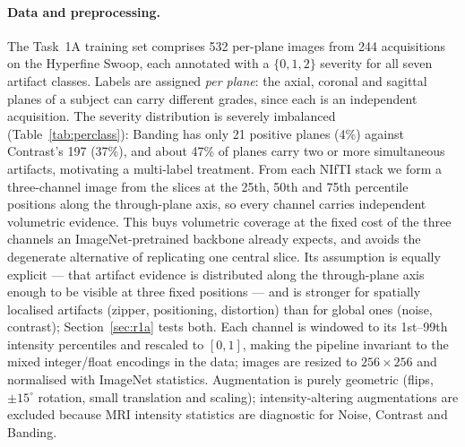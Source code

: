 \documentclass[runningheads]{llncs}
\newcommand{\addtwo}[1]{\textcolor{revtwo}{#1}}
\begin{document}
\paragraph{Data and preprocessing.}
The Task~1A training set comprises 532 per-plane images from 244 acquisitions on
the Hyperfine Swoop, each annotated with a $\{0,1,2\}$ severity for all seven
artifact classes. Labels are assigned \emph{per plane}: the axial, coronal and
sagittal planes of a subject can carry different grades, since each is an
independent acquisition. The severity distribution is severely imbalanced
(Table~\ref{tab:perclass}): Banding has only 21 positive planes (4\%) against
Contrast's 197 (37\%), and about 47\% of planes carry two or more simultaneous
artifacts, motivating a multi-label treatment. From each NIfTI stack we form a
three-channel image from the slices at the 25th, 50th and 75th percentile
positions along the through-plane axis, so every channel carries independent
volumetric evidence. \addtwo{This buys volumetric coverage at the fixed cost
of the three channels an ImageNet-pretrained backbone already expects, and avoids the
degenerate alternative of replicating one central slice. Its assumption is equally
explicit --- that artifact evidence is distributed along the through-plane axis enough
to be visible at three fixed positions --- and is stronger for spatially localised
artifacts (zipper, positioning, distortion) than for global ones (noise, contrast);
Section~\ref{sec:r1a} tests both.} Each channel is windowed to its 1st--99th intensity
percentiles and rescaled to $[0,1]$, making the pipeline invariant to the mixed
integer/float encodings in the data; images are resized to $256\times256$ and
normalised with ImageNet statistics. Augmentation is purely geometric
(flips, $\pm15^\circ$ rotation, small translation and scaling); intensity-altering
augmentations are excluded because MRI intensity statistics are diagnostic for
Noise, Contrast and Banding.
\end{document}
